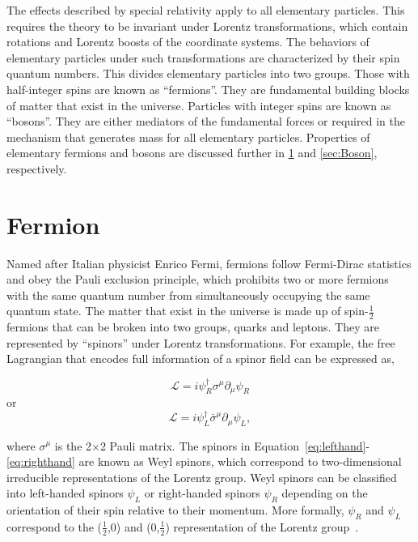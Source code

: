 The effects described by special relativity apply to all elementary particles. This requires the theory to be invariant under Lorentz transformations, which contain rotations and Lorentz boosts of the coordinate systems. The behaviors of elementary particles under such transformations are characterized by their spin quantum numbers. This divides elementary particles into two groups. Those with half-integer spins are known as ``fermions''. They are fundamental building blocks of matter that exist in the universe. Particles with integer spins are known as ``bosons''. They are either mediators of the fundamental forces or required in the mechanism that generates mass for all elementary particles. Properties of elementary fermions and bosons are discussed further in \ref{sec:Fermion} and \autoref{sec:Boson}, respectively. 

\section{Fermion}
\label{sec:Fermion}

Named after Italian physicist Enrico Fermi, fermions follow Fermi-Dirac statistics and obey the Pauli exclusion principle, which prohibits two or more fermions with the same quantum number from simultaneously occupying the same quantum state. The matter that exist in the universe is made up of spin-$\frac{1}{2}$ fermions that can be broken into two groups, quarks and leptons. They are represented by ``spinors'' under Lorentz transformations. For example, the free Lagrangian that encodes full information of a spinor field can be expressed as,

\begin{equation}
\label{eq:lefthand}
\mathcal{L}=i\psi_{R}^{\dagger}\sigma^{\mu}\partial_{\mu}\psi_{R}
\end{equation}
or
\begin{equation}
\label{eq:righthand}
\mathcal{L}=i\psi_{L}^{\dagger}\bar{\sigma}^{\mu}\partial_{\mu}\psi_{L},
\end{equation}

where $\sigma^{\mu}$ is the 2$\times$2 Pauli matrix. The spinors in Equation~\ref{eq:lefthand}-\ref{eq:righthand} are known as Weyl spinors, which correspond to two-dimensional irreducible representations of the Lorentz group. Weyl spinors can be classified into left-handed spinors $\psi_{L}$ or right-handed spinors $\psi_{R}$ depending on the orientation of their spin relative to their momentum. More formally, $\psi_{R}$ and $\psi_{L}$ correspond to the ($\frac{1}{2}$,0) and (0,$\frac{1}{2}$) representation of the Lorentz group~\cite{zee:group}.

